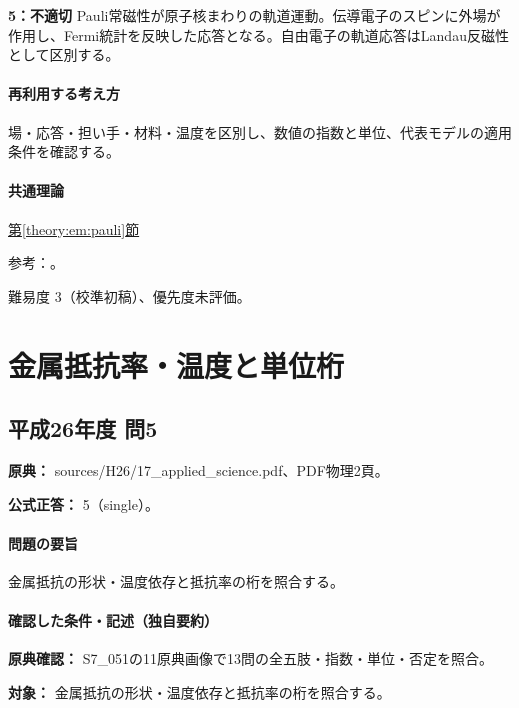 \noindent\textbf{5：不適切} Pauli常磁性が原子核まわりの軌道運動。伝導電子のスピンに外場が作用し、Fermi統計を反映した応答となる。自由電子の軌道応答はLandau反磁性として区別する。\par

\paragraph{再利用する考え方} 場・応答・担い手・材料・温度を区別し、数値の指数と単位、代表モデルの適用条件を確認する。

\paragraph{共通理論} \hyperref[theory:em:pauli]{第\ref*{theory:em:pauli}節}

\par 参考：\cite{em51_pauli,openstax_magnetism}。

\par 難易度 3（校準初稿）、優先度未評価。

\section{金属抵抗率・温度と単位桁}

\subsection{平成26年度 問5}
\label{q:h26-reg-applied-05}

\noindent\textbf{原典：} sources/H26/17\_applied\_science.pdf、PDF物理2頁。

\textbf{公式正答：} 5（single）。

\paragraph{問題の要旨} 金属抵抗の形状・温度依存と抵抗率の桁を照合する。

\paragraph{確認した条件・記述（独自要約）}\mbox{}\par

\noindent\textbf{原典確認：} S7\_051の11原典画像で13問の全五肢・指数・単位・否定を照合。\par

\noindent\textbf{対象：} 金属抵抗の形状・温度依存と抵抗率の桁を照合する。\par

